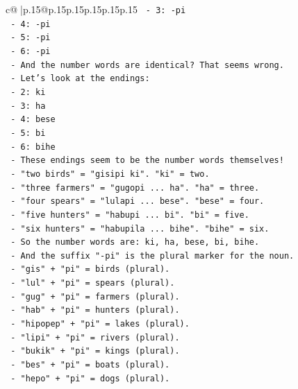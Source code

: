 \documentclass{article}
\begin{document}
{\begin{supertabular}{c@{$\;$}|p{.15\linewidth}@{}p{.15\linewidth}p{.15\linewidth}p{.15\linewidth}p{.15\linewidth}p{.15\linewidth}}
{{{\texttt{         {-} 3: {-}pi} \\
\texttt{         {-} 4: {-}pi} \\
\texttt{         {-} 5: {-}pi} \\
\texttt{         {-} 6: {-}pi} \\
\texttt{       {-} And the number words are identical? That seems wrong.} \\
\texttt{       {-} Let's look at the endings:} \\
\texttt{         {-} 2: ki} \\
\texttt{         {-} 3: ha} \\
\texttt{         {-} 4: bese} \\
\texttt{         {-} 5: bi} \\
\texttt{         {-} 6: bihe} \\
\texttt{       {-} These endings seem to be the number words themselves!} \\
\texttt{       {-} "two birds" = "gisipi ki". "ki" = two.} \\
\texttt{       {-} "three farmers" = "gugopi ... ha". "ha" = three.} \\
\texttt{       {-} "four spears" = "lulapi ... bese". "bese" = four.} \\
\texttt{       {-} "five hunters" = "habupi ... bi". "bi" = five.} \\
\texttt{       {-} "six hunters" = "habupila ... bihe". "bihe" = six.} \\
\texttt{       {-} So the number words are: ki, ha, bese, bi, bihe.} \\
\texttt{       {-} And the suffix "{-}pi" is the plural marker for the noun.} \\
\texttt{       {-} "gis" + "pi" = birds (plural).} \\
\texttt{       {-} "lul" + "pi" = spears (plural).} \\
\texttt{       {-} "gug" + "pi" = farmers (plural).} \\
\texttt{       {-} "hab" + "pi" = hunters (plural).} \\
\texttt{       {-} "hipopep" + "pi" = lakes (plural).} \\
\texttt{       {-} "lipi" + "pi" = rivers (plural).} \\
\texttt{       {-} "bukik" + "pi" = kings (plural).} \\
\texttt{       {-} "bes" + "pi" = boats (plural).} \\
\texttt{       {-} "hepo" + "pi" = dogs (plural).} \\
}}}
\end{supertabular}}
\end{document}
